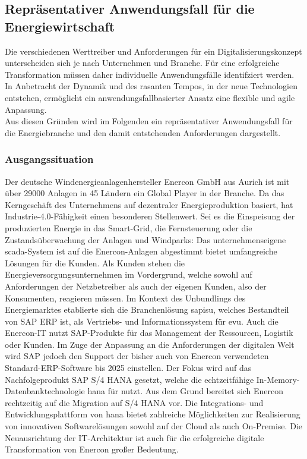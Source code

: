 \subsection{Repräsentativer Anwendungsfall für die Energiewirtschaft}\label{usecase}

Die verschiedenen Werttreiber und Anforderungen für ein Digitalisierungskonzept unterscheiden sich je nach Unternehmen und Branche.
Für eine erfolgreiche Transformation müssen daher individuelle Anwendungsfälle identifziert werden.
In Anbetracht der Dynamik und des rasanten Tempos, in der neue Technologien entstehen,
ermöglicht ein anwendungsfallbasierter Ansatz eine flexible und agile Anpassung. \citep[S. 31]{Acharya2019}
\\Aus diesen Gründen wird im Folgenden ein repräsentativer Anwendungsfall für die Energiebranche
und den damit entstehenden Anforderungen dargestellt.

\subsubsection{Ausgangssituation}

Der deutsche Windenergieanlagenhersteller Enercon GmbH aus Aurich ist mit über 29000 Anlagen in 45 Ländern ein Global Player in der Branche. Da das Kerngeschäft des Unternehmens auf dezentraler Energieproduktion basiert, hat Industrie-4.0-Fähigkeit einen besonderen Stellenwert. Sei es die Einspeisung der produzierten Energie in das Smart-Grid, die Fernsteuerung oder die Zustandsüberwachung der Anlagen und Windparks: Das unternehmenseigene \acf{scada}-System ist auf die Enercon-Anlagen abgestimmt bietet umfangreiche Lösungen für die Kunden. Als Kunden stehen die Energieversorgungsunternehmen im Vordergrund, welche sowohl auf Anforderungen der Netzbetreiber als auch der eigenen Kunden, also der Konsumenten, reagieren müssen. Im Kontext des Unbundlings des Energiemarktes etablierte sich die Branchenlösung \acf{sapisu}, welches Bestandteil von SAP ERP ist, als Vertriebs- und Informationssystem für \ac{evu}. Auch die Enercon-IT nutzt SAP-Produkte für das Management der Ressourcen, Logistik oder Kunden. Im Zuge der Anpassung an die Anforderungen der digitalen Welt wird SAP jedoch den Support der bisher auch von Enercon verwendeten Standard-ERP-Software bis 2025 einstellen. Der Fokus wird auf das Nachfolgeprodukt SAP S/4 HANA gesetzt, welche die echtzeitfähige In-Memory-Datenbanktechnologie \acf{hana} für nutzt. Aus dem Grund bereitet sich Enercon rechtzeitig auf die Migration auf S/4 HANA vor. Die Integrations- und Entwicklungsplattform von \ac{hana} bietet zahlreiche Möglichkeiten zur Realisierung von innovativen Softwarelösungen sowohl auf der Cloud als auch On-Premise. Die Neuausrichtung der IT-Architektur ist auch für die erfolgreiche digitale Transformation von Enercon großer Bedeutung.

